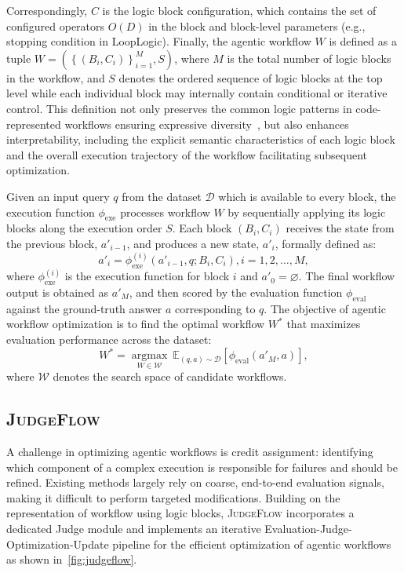 \documentclass{article}
\theoremstyle{plain}
\theoremstyle{definition}
\theoremstyle{remark}
\def \our{\textsc{JudgeFlow}}
\begin{document}
Correspondingly, $C$ is the logic block configuration, which contains the set of configured operators $O(D)$ in the block and block-level parameters (e.g., stopping condition in LoopLogic). Finally, the agentic workflow $W$ is defined as a tuple $W = \left(\left\{(B_i, C_i)\right\}_{i=1}^M, S\right)$, where $M$ is the total number of logic blocks in the workflow, and $S$ denotes the ordered sequence of logic blocks at the top level while each individual block may internally contain conditional or iterative control. This definition not only preserves the common logic patterns in code-represented workflows ensuring expressive diversity~\citep{hu_automated_2025,zhang_aflow_2025}, but also enhances interpretability, including the explicit semantic characteristics of each logic block and the overall execution trajectory of the workflow facilitating subsequent optimization.

Given an input query $q$ from the dataset $\mathcal{D}$ which is available to every block, the execution function $\phi_{\text{exe}}$ processes workflow $W$ by sequentially applying its logic blocks along the execution order $S$. Each block $(B_i, C_i)$ receives the state from the previous block, $a'_{i-1}$, and produces a new state, $a'_i$, formally defined as:
\begin{equation}
a'_i = \phi_{\text{exe}}^{(i)}(a'_{i-1}, q; B_i, C_i), i=1, 2,\ldots,M,
\end{equation}
where $\phi_{\text{exe}}^{(i)}$ is the execution function for block $i$ and $a'_0=\varnothing$. The final workflow output is obtained as $a'_M$, and then scored by the evaluation function $\phi_{\text{eval}}$ against the ground-truth answer $a$ corresponding to $q$. The objective of agentic workflow optimization is to find the optimal workflow $W^*$ that maximizes evaluation performance across the dataset:
\begin{equation}
W^* = \underset{W \in \mathcal{W}}{\operatorname{argmax}}\ \mathbb{E}_{(q, a) \sim \mathcal{D}} \left[ \phi_{\text{eval}} \left( a'_M, a \right) \right],
\end{equation}
where $\mathcal{W}$ denotes the search space of candidate workflows.



\subsection{\our{}}

A challenge in optimizing agentic workflows is credit assignment: identifying which component of a complex execution is responsible for failures and should be refined. Existing methods largely rely on coarse, end-to-end evaluation signals, making it difficult to perform targeted modifications. Building on the representation of workflow using logic blocks, \our{} incorporates a dedicated Judge module and implements an iterative Evaluation-Judge-Optimization-Update pipeline for the efficient optimization of agentic workflows as shown in~\cref{fig:judgeflow}.
\end{document}
